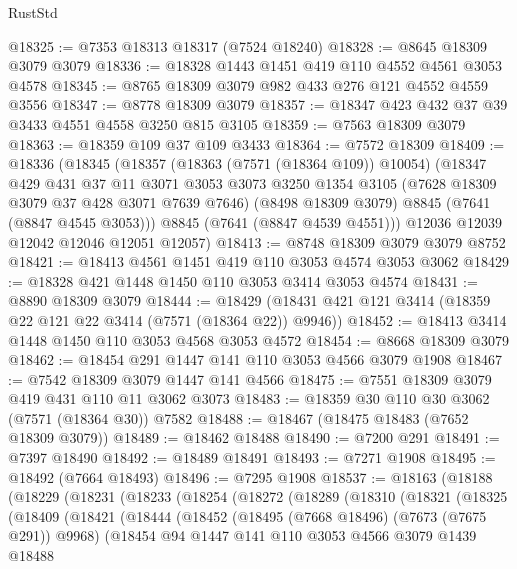 \begin{lexlean}{RustStd}
\begin{coremodule}
@18325 := @7353 @18313 @18317 (@7524 @18240)
@18328 := @8645 @18309 @3079 @3079
@18336 := @18328 @1443 @1451 @419 @110 @4552 @4561 @3053 @4578
@18345 := @8765 @18309 @3079 @982 @433 @276 @121 @4552 @4559 @3556
@18347 := @8778 @18309 @3079
@18357 := @18347 @423 @432 @37 @39 @3433 @4551 @4558 @3250 @815 @3105
@18359 := @7563 @18309 @3079
@18363 := @18359 @109 @37 @109 @3433
@18364 := @7572 @18309
@18409 := @18336
    (@18345
      (@18357
        (@18363 (@7571 (@18364 @109)) @10054)
        (@18347
          @429
          @431
          @37
          @11
          @3071
          @3053
          @3073
          @3250
          @1354
          @3105
          (@7628 @18309 @3079 @37 @428 @3071 @7639 @7646)
          (@8498 @18309 @3079)
          @8845
          (@7641 (@8847 @4545 @3053)))
        @8845
        (@7641 (@8847 @4539 @4551)))
      @12036
      @12039
      @12042
      @12046
      @12051
      @12057)
@18413 := @8748 @18309 @3079 @3079 @8752
@18421 := @18413 @4561 @1451 @419 @110 @3053 @4574 @3053 @3062
@18429 := @18328 @421 @1448 @1450 @110 @3053 @3414 @3053 @4574
@18431 := @8890 @18309 @3079
@18444 := @18429 (@18431 @421 @121 @3414 (@18359 @22 @121 @22 @3414 (@7571 (@18364 @22)) @9946))
@18452 := @18413 @3414 @1448 @1450 @110 @3053 @4568 @3053 @4572
@18454 := @8668 @18309 @3079
@18462 := @18454 @291 @1447 @141 @110 @3053 @4566 @3079 @1908
@18467 := @7542 @18309 @3079 @1447 @141 @4566
@18475 := @7551 @18309 @3079 @419 @431 @110 @11 @3062 @3073
@18483 := @18359 @30 @110 @30 @3062 (@7571 (@18364 @30)) @7582
@18488 := @18467 (@18475 @18483 (@7652 @18309 @3079))
@18489 := @18462 @18488
@18490 := @7200 @291
@18491 := @7397 @18490
@18492 := @18489 @18491
@18493 := @7271 @1908
@18495 := @18492 (@7664 @18493)
@18496 := @7295 @1908
@18537 := @18163
    (@18188
      (@18229
        (@18231
          (@18233
            (@18254
              (@18272
                (@18289
                  (@18310
                    (@18321
                      (@18325
                        (@18409
                          (@18421
                            (@18444
                              (@18452
                                (@18495 (@7668 @18496) (@7673 (@7675 @291)) @9968)
                                (@18454
                                  @94
                                  @1447
                                  @141
                                  @110
                                  @3053
                                  @4566
                                  @3079
                                  @1439
                                  @18488

\end{coremodule}
\end{lexlean}
